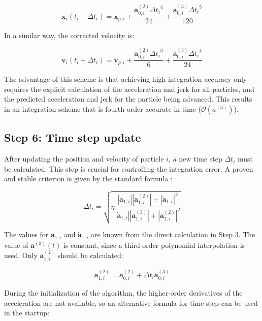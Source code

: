 \begin{appendixs}
	\begin{equation}
		\mathbf{x}_i(t_i + \Delta t_i) = \mathbf{x}_{p, i} + \frac{\mathbf{a}^{(2)}_{0, i} {\Delta t_i}^4}{24} + \frac{\mathbf{a}^{(3)}_{0, i} {\Delta t_i}^5}{120} \label{eq:ap_xcorr}
	\end{equation}
	
	In a similar way, the corrected velocity is:
	
	\begin{equation}
		\mathbf{v}_i(t_i + \Delta t_i) = \mathbf{v}_{p, i} + \frac{\mathbf{a}^{(2)}_{0, i} {\Delta t_i}^3}{6} + \frac{\mathbf{a}^{(3)}_{0, i} {\Delta t_i}^4}{24} \label{eq:ap_vcorr}
	\end{equation}
	
	The advantage of this scheme is that achieving high integration accuracy only requires the explicit calculation of the acceleration and jerk for all particles, and the predicted acceleration and jerk for the particle being advanced. This results in an integration scheme that is fourth-order accurate in time ($\mathcal{O}(a^{(3)})$).
	
	\subsection{Step 6: Time step update}
	
	After updating the position and velocity of particle $i$, a new time step $\Delta t_i$ must be calculated. This step is crucial for controlling the integration error. A proven and stable criterion is given by the standard formula \cite{aarseth1985}:
	
	\begin{equation}
		\Delta t_i = \sqrt{\eta \frac{|\mathbf{a}_{1, i}| |\mathbf{a}^{(2)}_{1, i}| + |\dot{\mathbf{a}}_{1, i}|^2}{|\dot{\mathbf{a}}_{1, i}| |\mathbf{a}^{(3)}_{1, i}| + |\mathbf{a}^{(2)}_{1, i}|^2}}
	\end{equation}
	
	The values for $\mathbf{a}_{1, i}$ and $\dot{\mathbf{a}}_{1, i}$ are known from the direct calculation in Step 3. The value of $\mathbf{a}^{(3)}(t)$ is constant, since a third-order polynomial interpolation is used. Only $\mathbf{a}^{(2)}_{1, i}$ should be calculated:
	
	\begin{equation}
		\mathbf{a}^{(2)}_{1, i} = \mathbf{a}^{(2)}_{0, i} + \Delta t_i \mathbf{a}^{(3)}_{0, i}
	\end{equation}
	
	During the initialization of the algorithm, the higher-order derivatives of the acceleration are not available, so an alternative formula for time step can be used in the startup:
	

\end{appendixs}
